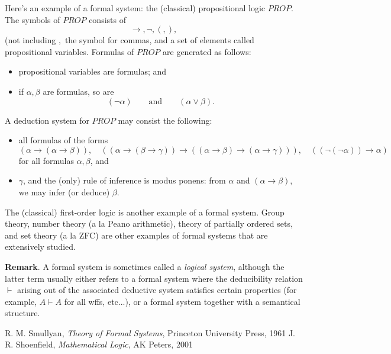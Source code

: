 \documentclass[12pt]{article}
\begin{document}
Here's an example of a formal system: the (classical) propositional logic $PROP$.  The symbols of $PROP$ consists of $$\to, \neg, (, ),$$ (not including $,$ the symbol for commas, and a set of elements called propositional variables.  Formulas of $PROP$ are generated as follows: 
\begin{itemize}
\item propositional variables are formulas; and 
\item if $\alpha,\beta$ are formulas, so are $$(\neg \alpha)\qquad\mbox{and}\qquad (\alpha \vee \beta).$$  
\end{itemize}
A deduction system for $PROP$ may consist the following: 
\begin{itemize}
\item all formulas of the forms $$(\alpha \to (\alpha \to \beta)),\quad ((\alpha \to (\beta\to \gamma)) \to ((\alpha \to \beta) \to (\alpha \to \gamma))), \quad ((\neg (\neg \alpha)) \to \alpha)$$ for all formulas $\alpha,\beta$, and 
\item $\gamma$, and the (only) rule of inference is modus ponens: from $\alpha$ and $(\alpha \to \beta)$, we may infer (or deduce) $\beta$.
\end{itemize}

The (classical) first-order logic is another example of a formal system.  Group theory, number theory (a la Peano arithmetic), theory of partially ordered sets, and set theory (a la ZFC) are other examples of formal systems that are extensively studied.

\textbf{Remark}.  A formal system is sometimes called a \emph{logical system}, although the latter term usually either refers to a formal system where the deducibility relation $\vdash$ arising out of the associated deductive system satisfies certain properties (for example, $A\vdash A$ for all wffs, etc...), or a formal system together with a semantical structure.

\begin{thebibliography}{0}
R. M. Smullyan,
{\it Theory of Formal Systems}, Princeton University Press, 1961
J. R. Shoenfield,
{\it Mathematical Logic}, AK Peters, 2001
\end{thebibliography}
\end{document}

